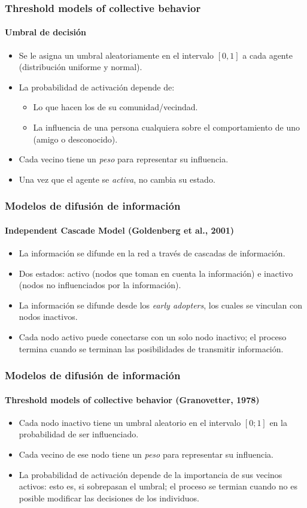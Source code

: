 \documentclass[11pt]{beamer}
\begin{document}
\begin{frame}
	\frametitle{Threshold models of collective behavior}
	\framesubtitle{Umbral de decisión}
	\begin{itemize}
		\item Se le asigna un umbral aleatoriamente en el intervalo $[0,1]$ a cada agente (distribución uniforme y normal).
		\item La probabilidad de activación depende de:
		\begin{itemize}
			\item Lo que hacen los de su comunidad/vecindad.
			\item La influencia de una persona cualquiera sobre el comportamiento de uno (amigo o desconocido).
		\end{itemize}
		\item Cada vecino tiene un \textit{peso} para representar su influencia.
		\item Una vez que el agente se \textit{activa}, no cambia su estado.
	\end{itemize}
\end{frame}

\begin{frame}
	\frametitle{Modelos de difusión de información}
	\framesubtitle{Independent Cascade Model (Goldenberg et al., 2001)}
	\begin{itemize}
			\item La información se difunde en la red a través de cascadas de información.
			\item Dos estados: activo (nodos que toman en cuenta la información) e inactivo (nodos no influenciados por la información).
			\item La información se difunde desde los \textit{early adopters}, los cuales se vinculan con nodos inactivos.
			\item Cada nodo activo puede conectarse con un solo nodo inactivo; el proceso termina cuando se terminan las posibilidades de transmitir información.
	\end{itemize}
\end{frame}

\begin{frame}
	\frametitle{Modelos de difusión de información}
	\framesubtitle{Threshold models of collective behavior (Granovetter, 1978)}
		\begin{itemize}
	\item Cada nodo inactivo tiene un umbral aleatorio en el intervalo $[0 ; 1]$ en la probabilidad de ser influenciado.
	\item Cada vecino de ese nodo tiene un \textit{peso} para representar su influencia.
	\item La probabilidad de activación depende de la importancia de sus vecinos activos: esto es, si sobrepasan el umbral; el proceso se termian cuando no es posible modificar las decisiones de los individuos.
\end{itemize}
\end{frame}
\end{document}
